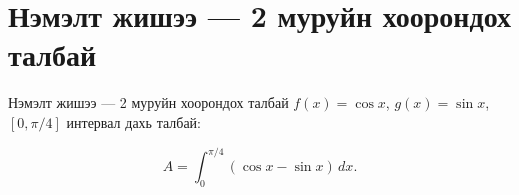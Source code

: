 \section{Нэмэлт жишээ — 2 муруйн хоорондох талбай}
\begin{frame}[allowframebreaks]{Нэмэлт жишээ — 2 муруйн хоорондох талбай}
$f(x)=\cos x$, $g(x)=\sin x$, $[0,\pi/4]$ интервал дахь талбай:

\[
A=\int_{0}^{\pi/4} (\cos x - \sin x)\, dx.
\]
\end{frame}


